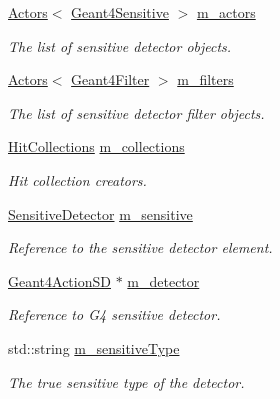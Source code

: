 \begin{DoxyCompactItemize}
\hyperlink{class_d_d4hep_1_1_simulation_1_1_geant4_action_1_1_actors}{Actors}$<$ \hyperlink{class_d_d4hep_1_1_simulation_1_1_geant4_sensitive}{Geant4Sensitive} $>$ \hyperlink{class_d_d4hep_1_1_simulation_1_1_geant4_sens_det_action_sequence_aa383f58ddce351dc9df9451bee3feb0f}{m\_\-actors}
\begin{DoxyCompactList}\small\item\em The list of sensitive detector objects. \item\end{DoxyCompactList}\item 
\hyperlink{class_d_d4hep_1_1_simulation_1_1_geant4_action_1_1_actors}{Actors}$<$ \hyperlink{class_d_d4hep_1_1_simulation_1_1_geant4_filter}{Geant4Filter} $>$ \hyperlink{class_d_d4hep_1_1_simulation_1_1_geant4_sens_det_action_sequence_a67b12a0e51d5249be593f874182155ab}{m\_\-filters}
\begin{DoxyCompactList}\small\item\em The list of sensitive detector filter objects. \item\end{DoxyCompactList}\item 
\hyperlink{class_d_d4hep_1_1_simulation_1_1_geant4_sens_det_action_sequence_aabeb325e4b6af156cbae3578b00301b3}{HitCollections} \hyperlink{class_d_d4hep_1_1_simulation_1_1_geant4_sens_det_action_sequence_a58c74511f9bef97e83b5a7e54b4917ca}{m\_\-collections}
\begin{DoxyCompactList}\small\item\em Hit collection creators. \item\end{DoxyCompactList}\item 
\hyperlink{class_d_d4hep_1_1_geometry_1_1_sensitive_detector}{SensitiveDetector} \hyperlink{class_d_d4hep_1_1_simulation_1_1_geant4_sens_det_action_sequence_a480029ca979ac872688986da731930b8}{m\_\-sensitive}
\begin{DoxyCompactList}\small\item\em Reference to the sensitive detector element. \item\end{DoxyCompactList}\item 
\hyperlink{class_d_d4hep_1_1_simulation_1_1_geant4_action_s_d}{Geant4ActionSD} $\ast$ \hyperlink{class_d_d4hep_1_1_simulation_1_1_geant4_sens_det_action_sequence_a4c35959bba4b7d3f05a8aa48970be68a}{m\_\-detector}
\begin{DoxyCompactList}\small\item\em Reference to G4 sensitive detector. \item\end{DoxyCompactList}\item 
std::string \hyperlink{class_d_d4hep_1_1_simulation_1_1_geant4_sens_det_action_sequence_a51bf2c5186ea7905ae655b44d6aea06f}{m\_\-sensitiveType}
\begin{DoxyCompactList}\small\item\em The true sensitive type of the detector. \item\end{DoxyCompactList}\end{DoxyCompactItemize}


